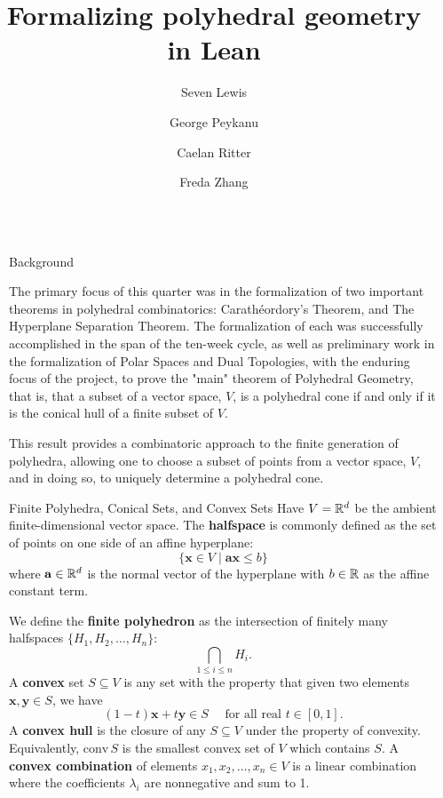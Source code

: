 \documentclass[final]{beamer}
\title{Formalizing polyhedral geometry in Lean}
\author{Seven Lewis \and George Peykanu \and Caelan Ritter \and Freda Zhang}
\institute[]{University of Washington}
\newlength{\sepwidth}
\newlength{\colwidth}
\newcommand{\separatorcolumn}{\begin{column}{\sepwidth}\end{column}}
\begin{document}
\begin{frame}[fragile]
    \begin{columns}[t]
        \separatorcolumn

        \begin{column}{\colwidth}

            \begin{block}{Background}
           
                The primary focus of this quarter was in the formalization of two important theorems in polyhedral combinatorics:
                Carath\'eordory's Theorem, and The Hyperplane Separation Theorem. The formalization of each was successfully accomplished in the
                span of the ten-week cycle, as well as preliminary work in the formalization of Polar Spaces and Dual Topologies, with the enduring
                focus of the project, to prove the "main" theorem of Polyhedral Geometry, that is, that a subset of a vector space, $V$, is a polyhedral cone
                if and only if it is the conical hull of a finite subset of $V$.

                This result provides a combinatoric approach to the finite generation of polyhedra, allowing one to choose a subset of points from a vector space,
                $V$, and in doing so, to uniquely determine a polyhedral cone.
            \end{block}

            \begin{block}{Finite Polyhedra, Conical Sets, and Convex Sets}
                Have $V = \mathbb{R}^d$ be the ambient finite-dimensional vector space. The \textbf{halfspace} is commonly defined as the set of points on one side of an affine hyperplane:
                $$ \{\mathbf{x} \in V \;|\; \mathbf{ax} \leq b\}$$
                where $\mathbf{a} \in \mathbb{R}^d$ is the normal vector of the hyperplane with $b \in \mathbb{R}$ as the affine constant term.

                We define the \textbf{finite polyhedron} as the intersection of finitely many halfspaces $\{H_1,H_2,\dots,H_n\}$:
                $$ \bigcap_{1 \leq i \leq n} H_i. $$
                A \textbf{convex} set $S \subseteq V$ is any set with the property that given two elements $\mathbf{x}, \mathbf{y} \in S$, we have
                $$ (1 - t)\mathbf{x} + t\mathbf{y} \in S \quad \text{ for all real } t \in [0,1].$$
                A \textbf{convex hull} is the closure of any $S \subseteq V$ under the property of convexity. Equivalently, $\text{conv}\,S$ is the smallest convex set of $V$ which contains $S$. A \textbf{convex combination} of elements $x_1,x_2,\dots,x_n \in V$ is a linear combination where the coefficients $\lambda_i$ are nonnegative and sum to 1. 


\end{block}
\end{column}
\end{columns}
\end{frame}
\end{document}
